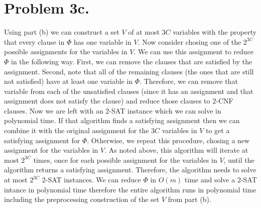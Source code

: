\documentclass[12pt]{article}
\begin{document}
\section*{Problem 3c.}
Using part (b) we can construct a set $V$ of at most $3C$ variables with the
property that every clause in $\Phi$ has one variable in $V$. Now consider
chosing one of the $2^{3C}$ possible assignments for the variables in $V$. We
can use this assignment to reduce $\Phi$ in the following way. First, we can
remove the clauses that are satisfied by the assignment. Second, note that all
of the remaining clauses (the ones that are still not satisfied) have at least
one variable in $\Phi$. Therefore, we can remove that variable from each
of the unsatisfied clauses (since it has an assignment and that assignment does
not satisfy the clause) and reduce those clauses to 2-CNF clauses. Now we
are left with an 2-SAT instance which we can solve in polynomial time. If that
algorithm finds a satisfying assignment then we can combine it with the original
assignment for the $3C$ variables in $V$ to get a satisfying assignment for
$\Phi$. Otherwise, we repeat this procedure, chosing a new assignment for the
variables in $V$. As noted above, this algorithm will iterate at most $2^{3C}$
times, once for each possible assignment for the variables in $V$, until the
algorithm returns a satisfying assignment. Therefore, the algorithm needs to
solve at most $2^{3C}$ 2-SAT instances. We can reduce $\Phi$ in $O(m)$ time
and solve a 2-SAT intance in polynomial time therefore the entire algorithm
runs in polynomial time including the preprocessing construction of the set
$V$ from part (b).
\end{document}
